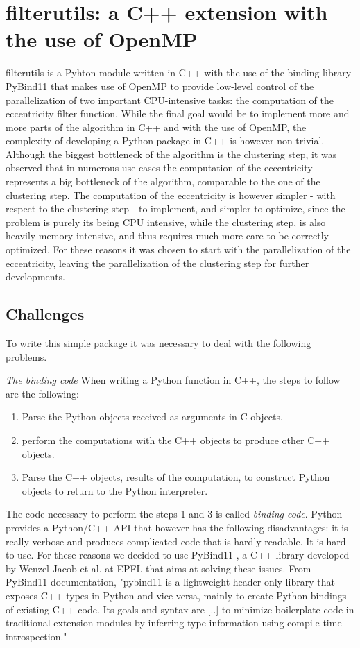 \section{filterutils: a C++ extension with the use of OpenMP}
filterutils is a Pyhton module written in C++ with the use of the binding library PyBind11 \cite{pybind11} that makes use of OpenMP to provide low-level control of the parallelization of two important CPU-intensive tasks: the computation of the eccentricity filter function. While the final goal would be to implement more and more parts of the algorithm in C++ and with the use of OpenMP, the complexity of developing a Python package in C++ is however non trivial. Although the biggest bottleneck of the algorithm is the clustering step, it was observed that in numerous use cases the computation of the eccentricity represents a big bottleneck of the algorithm, comparable to the one of the clustering step. The computation of the eccentricity is however simpler - with respect to the clustering step - to implement, and simpler to optimize, since the problem is purely its being CPU intensive, while the clustering step, is also heavily memory intensive, and thus requires much more care to be correctly optimized. For these reasons it was chosen to start with the parallelization of the eccentricity, leaving the parallelization of the clustering step for further developments.

\subsection*{Challenges} 
To write this simple package it was necessary to deal with the following problems. 

\textit{The binding code} When writing a Python function in C++, the steps to follow are the following:
\begin{enumerate}
	\item Parse the Python objects received as arguments in C objects.
	\item perform the computations with the C++ objects to produce other C++ objects.
	\item Parse the C++ objects, results of the computation, to construct Python objects to return to the Python interpreter.
\end{enumerate}
The code necessary to perform the steps 1 and 3 is called \textit{binding code}. Python provides a Python/C++ API that however has the following disadvantages: it is really verbose and produces complicated code that is hardly readable. It is hard to use. For these reasons we decided to use PyBind11 \cite{pybind11}, a C++ library developed by Wenzel Jacob et al. at EPFL that aims at solving these issues. From PyBind11 documentation, "pybind11 is a lightweight header-only library that exposes C++ types in Python and vice versa, mainly to create Python bindings of existing C++ code. Its goals and syntax are [..] to minimize boilerplate code in traditional extension modules by inferring type information using compile-time introspection."

